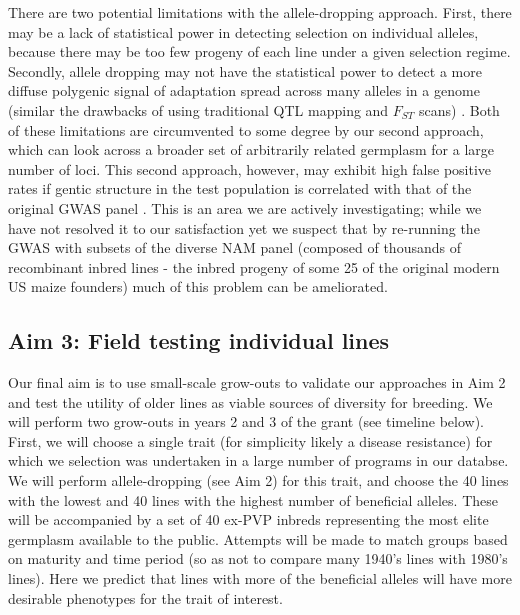 \documentclass[12pt]{article}
\begin{document}
There are two potential limitations with the allele-dropping approach. First, there may be a lack of statistical power in detecting selection on individual alleles, because there may be too few progeny of each line under a given selection regime. 
Secondly, allele dropping may not have the statistical power to detect a more diffuse polygenic signal of adaptation spread across many alleles in a genome (similar the drawbacks of using traditional QTL mapping and $F_{ST}$ scans) \cite{Rockman:2011ej, Berg:2014bs}. 
Both of these limitations are circumvented to some degree by our second approach, which can look across a broader set of arbitrarily related germplasm for a large number of loci.
This second approach, however, may exhibit high false positive rates if gentic structure in the test population is correlated with that of the original GWAS panel \citep{Berg:2014bs}. 
This is an area we are actively investigating; while we have not resolved it to our satisfaction yet we suspect that by re-running the GWAS with subsets of the diverse NAM \citep{mcmullen2009genetic} panel (composed of thousands of recombinant inbred lines - the inbred progeny of some 25 of the original modern US maize founders) much of this problem can be ameliorated.  

\subsection*{Aim 3: Field testing individual lines}

Our final aim is to use small-scale grow-outs to validate our approaches in Aim 2 and test the utility of older lines as viable sources of diversity for breeding.
We will perform two grow-outs in years 2 and 3 of the grant (see timeline below).
First, we will choose a single trait (for simplicity likely a disease resistance) for which we selection was undertaken in a large number of programs in our databse.
We will perform allele-dropping (see Aim 2) for this trait, and choose the 40 lines with the lowest and 40 lines with the highest number of beneficial alleles.
These will be accompanied by a set of 40 ex-PVP inbreds representing the most elite germplasm available to the public. 
Attempts will be made to match groups based on maturity and time period (so as not to compare many 1940's lines with 1980's lines).
Here we predict that lines with more of the beneficial alleles will have more desirable phenotypes for the trait of interest.
\end{document}
